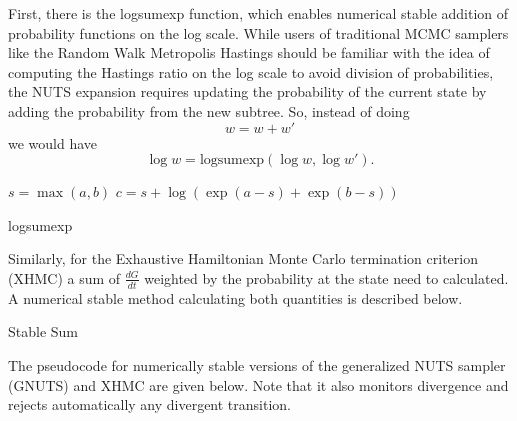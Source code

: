 \documentclass[12pt]{report}
\begin{document}
First, there is the logsumexp function, which enables numerical stable addition of probability functions on the log scale. While users of traditional MCMC samplers like the Random Walk Metropolis Hastings should be familiar with the idea of computing the Hastings ratio on the log scale to avoid division of probabilities, the NUTS expansion requires updating the probability of the current state by adding the probability from the new subtree. So, instead of doing 
\[ w = w + w' \] 
we would have
\[ \log w = \text{logsumexp}(\log w, \log w' ). \]

\begin{algorithm}
\DontPrintSemicolon
{}
$s = \max(a,b) $\;
$c = s + \log( \exp(a-s) + \exp(b-s)) $\;

\caption{logsumexp}
\end{algorithm}

Similarly, for the Exhaustive Hamiltonian Monte Carlo termination criterion (XHMC) a sum of $\frac{dG}{dt}$ weighted by the probability at the state need to calculated. A numerical stable method calculating both quantities is described below.

\begin{algorithm}
\DontPrintSemicolon
{}

\caption{Stable Sum }
\end{algorithm}

The pseudocode for numerically stable versions of the generalized NUTS sampler (GNUTS) and XHMC are given below. Note that it also monitors divergence and rejects automatically any divergent transition.
\end{document}
